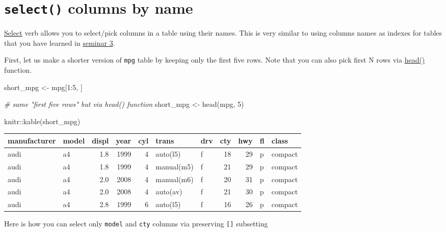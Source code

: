 \documentclass[
]{book}
\newenvironment{Shaded}{\begin{snugshade}}{\end{snugshade}}
\newcommand{\CommentTok}[1]{\textcolor[rgb]{0.56,0.35,0.01}{\textit{#1}}}
\newcommand{\DecValTok}[1]{\textcolor[rgb]{0.00,0.00,0.81}{#1}}
\newcommand{\FunctionTok}[1]{\textcolor[rgb]{0.00,0.00,0.00}{#1}}
\newcommand{\NormalTok}[1]{#1}
\newcommand{\OtherTok}[1]{\textcolor[rgb]{0.56,0.35,0.01}{#1}}
\newcommand{\SpecialCharTok}[1]{\textcolor[rgb]{0.00,0.00,0.00}{#1}}
\begin{document}
\hypertarget{select}{%
\section{\texorpdfstring{\texttt{select()} columns by name}{select() columns by name}}\label{select}}

\href{https://dplyr.tidyverse.org/reference/select.html}{Select} verb allows you to select/pick columns in a table using their names. This is very similar to using columns names as indexes for tables that you have learned in \protect\hyperlink{table-indexing}{seminar 3}.

First, let us make a shorter version of \texttt{mpg} table by keeping only the first five rows. Note that you can also pick first N rows via \href{https://stat.ethz.ch/R-manual/R-devel/library/utils/html/head.html}{head()} function.

\begin{Shaded}
\begin{Highlighting}[]
\NormalTok{short\_mpg }\OtherTok{\textless{}{-}}\NormalTok{ mpg[}\DecValTok{1}\SpecialCharTok{:}\DecValTok{5}\NormalTok{, ]}

\CommentTok{\# same "first five rows" but via head() function}
\NormalTok{short\_mpg }\OtherTok{\textless{}{-}} \FunctionTok{head}\NormalTok{(mpg, }\DecValTok{5}\NormalTok{)}

\NormalTok{knitr}\SpecialCharTok{::}\FunctionTok{kable}\NormalTok{(short\_mpg)}
\end{Highlighting}
\end{Shaded}

\begin{tabular}{l|l|r|r|r|l|l|r|r|l|l}
\hline
manufacturer & model & displ & year & cyl & trans & drv & cty & hwy & fl & class\\
\hline
audi & a4 & 1.8 & 1999 & 4 & auto(l5) & f & 18 & 29 & p & compact\\
\hline
audi & a4 & 1.8 & 1999 & 4 & manual(m5) & f & 21 & 29 & p & compact\\
\hline
audi & a4 & 2.0 & 2008 & 4 & manual(m6) & f & 20 & 31 & p & compact\\
\hline
audi & a4 & 2.0 & 2008 & 4 & auto(av) & f & 21 & 30 & p & compact\\
\hline
audi & a4 & 2.8 & 1999 & 6 & auto(l5) & f & 16 & 26 & p & compact\\
\hline
\end{tabular}

Here is how you can select only \texttt{model} and \texttt{cty} columns via preserving \texttt{{[}{]}} subsetting
\end{document}
